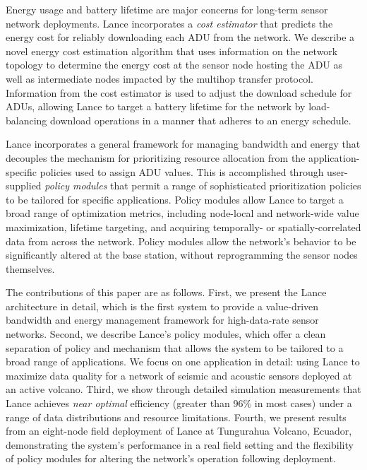 Energy usage and battery lifetime are major concerns for long-term
sensor network deployments. 
Lance incorporates a {\em cost estimator} that
predicts the energy cost for reliably
downloading each ADU from the network. We describe a novel energy cost
estimation algorithm that uses information on the network topology to 
determine the energy cost at the sensor node hosting the ADU as well
as intermediate nodes impacted by the multihop transfer protocol. 
Information from the cost estimator is used to adjust the download
schedule for ADUs, allowing Lance to target a battery lifetime for 
the network by load-balancing download operations in a manner that
adheres to an energy schedule.

Lance incorporates a general framework for managing bandwidth and
energy that decouples the mechanism for prioritizing resource allocation from
the application-specific policies used to assign ADU values.
This is accomplished through user-supplied {\em policy modules} that
permit a range of sophisticated prioritization policies to be
tailored for specific applications. Policy modules allow Lance to
target a broad range of optimization metrics, including node-local and
network-wide value maximization, lifetime targeting, 
and acquiring temporally-
or spatially-correlated data from across the network. 
Policy modules allow the network's behavior to be significantly altered
at the base station, without reprogramming the sensor nodes themselves.

The contributions of this paper are as follows. First, we present the
Lance architecture in detail, which is the first system to provide 
a value-driven bandwidth and energy management framework for 
high-data-rate sensor networks. Second, we describe Lance's policy 
modules, which offer a clean separation of policy and mechanism that 
allows the system to be tailored to a broad range of applications. 
We focus on one application in detail: using Lance to maximize data 
quality for a network of seismic and acoustic sensors deployed at 
an active volcano. Third, we show through detailed simulation 
measurements that Lance achieves {\em near optimal} efficiency 
(greater than 96\% in most cases) under a range of data distributions 
and resource limitations. 
Fourth, we present results from 
an eight-node field deployment of Lance at Tungurahua Volcano, 
Ecuador, demonstrating the system's performance in a real 
field setting and the flexibility of policy modules for 
altering the network's operation following deployment. 

